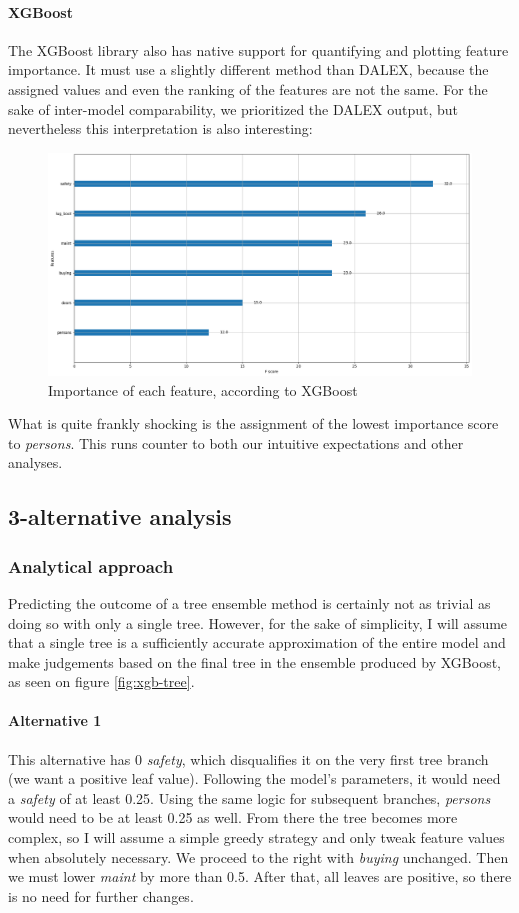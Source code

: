 \documentclass[../main.tex]{subfiles}
\begin{document}
\paragraph{XGBoost} The XGBoost library also has native support for quantifying
and plotting feature importance. It must use a slightly different method than
DALEX, because the assigned values and even the ranking of the features are not
the same. For the sake of inter-model comparability, we prioritized the DALEX
output, but nevertheless this interpretation is also interesting:
\begin{figure}[H]
	\centering
	\includegraphics[width=\linewidth]{../img/xgb-feature-importance-xgboost.png}
	\caption{Importance of each feature, according to XGBoost}
	\label{fig:xgb-feats-xgboost}
\end{figure}
What is quite frankly shocking is the assignment of the lowest importance score
to \emph{persons}. This runs counter to both our intuitive expectations and
other analyses.

\subsection{3-alternative analysis}
\subsubsection{Analytical approach}
Predicting the outcome of a tree ensemble method is certainly not as trivial as
doing so with only a single tree. However, for the sake of simplicity, I will
assume that a single tree is a sufficiently accurate approximation of the
entire model and make judgements based on the final tree in the ensemble
produced by XGBoost, as seen on figure \ref{fig:xgb-tree}.
\paragraph{Alternative 1} This alternative has 0 \emph{safety}, which
disqualifies it on the very first tree branch (we want a positive leaf value).
Following the model's parameters, it would need a \emph{safety} of at least
0.25. Using the same logic for subsequent branches, \emph{persons} would
need to be at least 0.25 as well. From there the tree becomes more
complex, so I will assume a simple greedy strategy and only tweak feature
values when absolutely necessary. We proceed to the right with \emph{buying}
unchanged. Then we must lower \emph{maint} by more than 0.5. After
that, all leaves are positive, so there is no need for further changes.
\end{document}
